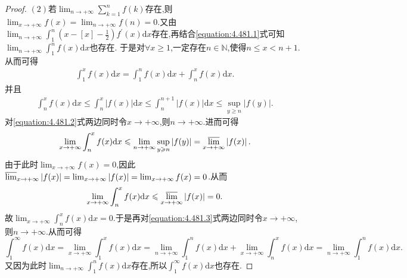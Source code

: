 \documentclass[../../main.tex]{subfiles}
\begin{document}
\begin{proof}
\((2)\)若\(\lim_{n\rightarrow +\infty}\sum_{k = 1}^n f(k)\)存在,则\(\lim_{x\rightarrow +\infty}f(x)=\lim_{n\rightarrow +\infty}f(n)=0\).又由\(\lim_{n\rightarrow +\infty}\int_1^n\left(x - [x] - \frac{1}{2}\right)f^\prime(x)\mathrm{d}x\)存在,再结合\eqref{equation:4.481.1}式可知\(\lim_{n\rightarrow +\infty}\int_1^n f(x)\mathrm{d}x\)也存在.
于是对\(\forall x\geqslant1\),一定存在\(n\in\mathbb{N}\),使得\(n\leqslant x < n + 1\).从而可得
\begin{align}\label{equation:4.481.3}
\int_1^x f(x)\mathrm{d}x=\int_1^n f(x)\mathrm{d}x+\int_n^x f(x)\mathrm{d}x. 
\end{align}
并且
\begin{align}\label{equation:4.481.2}
\int_n^x f(x)\mathrm{d}x\leqslant\int_n^x\left|f(x)\right|\mathrm{d}x\leqslant\int_n^{n + 1}\left|f(x)\right|\mathrm{d}x\leqslant\sup_{y\geqslant n}\left|f(y)\right|.
\end{align}
对\eqref{equation:4.481.2}式两边同时令\(x\rightarrow +\infty\),则\(n\rightarrow +\infty\).进而可得
\[
\lim_{x\rightarrow +\infty}\int_n^x f(x)\mathrm{d}x\leqslant\lim_{n\rightarrow +\infty}\sup_{y\geqslant n}\left|f(y)\right|={\varlimsup_{x\rightarrow +\infty}}\left|f(x)\right|.
\]
由于此时\(\lim_{x\rightarrow +\infty}f(x)=0\),因此\({\varlimsup_{x\rightarrow +\infty}}\left|f(x)\right|=\lim_{x\rightarrow +\infty}\left|f(x)\right|=\lim_{x\rightarrow +\infty}f(x)=0\).从而
\[
\lim_{x\rightarrow +\infty}\int_n^x f(x)\mathrm{d}x\leqslant{\varlimsup_{x\rightarrow +\infty}}\left|f(x)\right|=0.
\]
故\(\lim_{x\rightarrow +\infty}\int_n^x f(x)\mathrm{d}x = 0\).于是再对\eqref{equation:4.481.3}式两边同时令\(x\rightarrow +\infty\),则\(n\rightarrow +\infty\).从而可得
\[
\int_1^{\infty}f(x)\mathrm{d}x=\lim_{x\rightarrow +\infty}\int_1^x f(x)\mathrm{d}x=\lim_{n\rightarrow +\infty}\int_1^n f(x)\mathrm{d}x+\lim_{x\rightarrow +\infty}\int_n^x f(x)\mathrm{d}x=\lim_{n\rightarrow +\infty}\int_1^n f(x)\mathrm{d}x.
\]
又因为此时\(\lim_{n\rightarrow +\infty}\int_1^n f(x)\mathrm{d}x\)存在,所以\(\int_1^{\infty}f(x)\mathrm{d}x\)也存在.
\end{proof}
\end{document}
